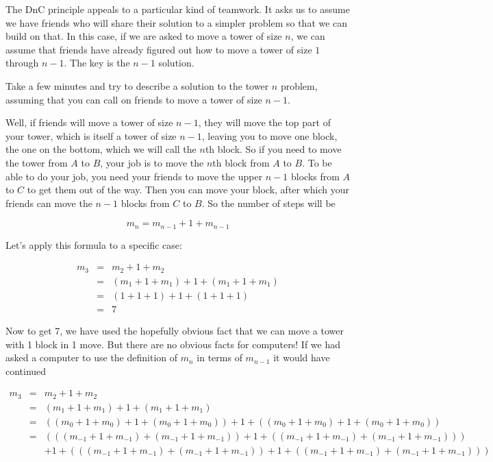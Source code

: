 \documentclass[12pt]{amsbook}
\begin{document}
The DnC principle appeals to a particular kind of teamwork.  It asks us to assume we have friends who will share their solution to a simpler problem so that we can build on that.  In this case, if we are asked to move a tower of size $n$, we can assume that friends have already figured out how to move a tower of size $1$ through $n-1$.  The key is the $n-1$ solution.

Take a few minutes and try to describe a solution to the tower $n$ problem, assuming that you can call on friends to move a tower of size $n-1$.

Well, if friends will move a tower of size $n-1$, they will move the top part of your tower, which is itself a tower of size $n-1$, leaving you to move one block, the one on the bottom, which we will call the $n$th block.  So if you need to move the tower from $A$ to $B$, your job is to move the $n$th block from $A$ to $B$.  To be able to do your job, you need your friends to move the upper $n-1$ blocks from $A$ to $C$ to get them out of the way.  Then you can move your block, after which your friends can move the $n-1$ blocks from $C$ to $B$.  So the number of steps will be

$$
m_n = m_{n-1} + 1 + m_{n-1}
$$

Let's apply this formula to a specific case:

$$
\begin{aligned}
m_3 & = & m_2 + 1 + m_2 \\
    & = & (m_1 + 1 + m_1) + 1 + (m_1 + 1 + m_1) \\
    & = & (1 + 1 + 1) + 1 + (1 + 1 + 1) \\
    & = & 7
\end{aligned}
$$

Now to get 7, we have used the hopefully obvious fact that we can move a tower with 1 block in 1 move.  But there are no obvious facts for computers!  If we had asked a computer to use the definition of $m_n$ in terms of $m_{n-1}$ it would have continued

{\small
$$
\begin{aligned}
m_3 & = & m_2 + 1 + m_2 \\
    & = & (m_1 + 1 + m_1) + 1 + (m_1 + 1 + m_1) \\
    & = & ((m_0 + 1 + m_0) + 1 + (m_0 + 1 + m_0)) + 1 + ((m_0 + 1 + m_0) + 1 + (m_0 + 1 + m_0)) \\
    & = & (((m_{-1} + 1 + m_{-1}) + (m_{-1} + 1 + m_{-1})) + 1 + ((m_{-1} + 1 + m_{-1}) + (m_{-1} + 1 + m_{-1})) ) \\
       & &     + 1 + (((m_{-1} + 1 + m_{-1}) + (m_{-1} + 1 + m_{-1})) + 1 + ((m_{-1} + 1 + m_{-1}) + (m_{-1} + 1 + m_{-1})) ) \\
\end{aligned}
$$
}
\end{document}
